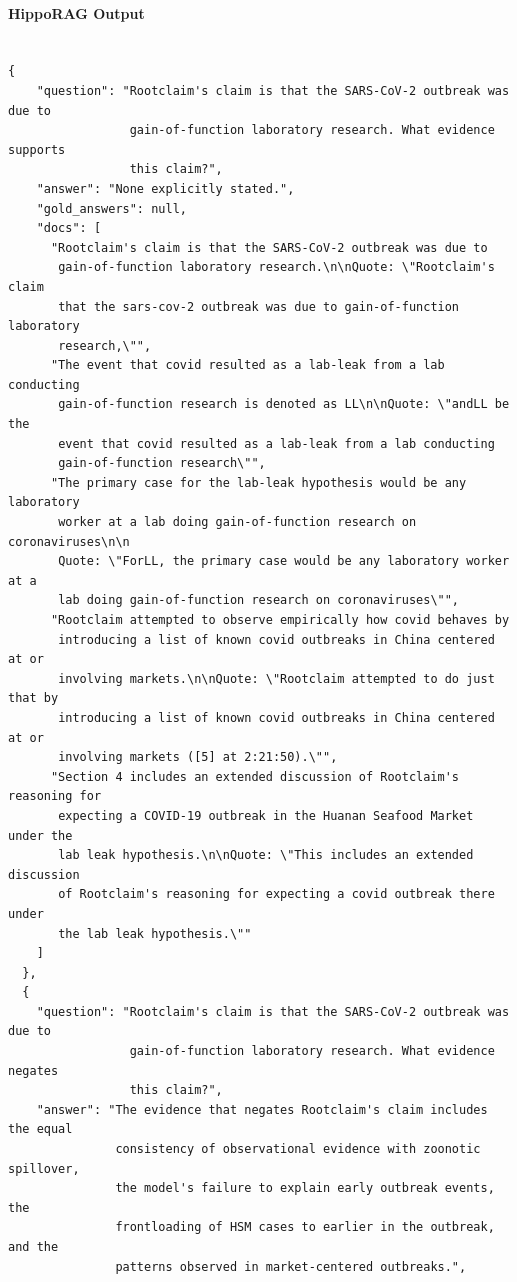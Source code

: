 \documentclass{article}
\begin{document}
\paragraph{HippoRAG Output}
\begin{verbatim}

{
    "question": "Rootclaim's claim is that the SARS-CoV-2 outbreak was due to 
                 gain-of-function laboratory research. What evidence supports 
                 this claim?",
    "answer": "None explicitly stated.",
    "gold_answers": null,
    "docs": [
      "Rootclaim's claim is that the SARS-CoV-2 outbreak was due to 
       gain-of-function laboratory research.\n\nQuote: \"Rootclaim's claim 
       that the sars-cov-2 outbreak was due to gain-of-function laboratory 
       research,\"",
      "The event that covid resulted as a lab-leak from a lab conducting 
       gain-of-function research is denoted as LL\n\nQuote: \"andLL be the 
       event that covid resulted as a lab-leak from a lab conducting 
       gain-of-function research\"",
      "The primary case for the lab-leak hypothesis would be any laboratory 
       worker at a lab doing gain-of-function research on coronaviruses\n\n
       Quote: \"ForLL, the primary case would be any laboratory worker at a 
       lab doing gain-of-function research on coronaviruses\"",
      "Rootclaim attempted to observe empirically how covid behaves by 
       introducing a list of known covid outbreaks in China centered at or 
       involving markets.\n\nQuote: \"Rootclaim attempted to do just that by 
       introducing a list of known covid outbreaks in China centered at or 
       involving markets ([5] at 2:21:50).\"",
      "Section 4 includes an extended discussion of Rootclaim's reasoning for 
       expecting a COVID-19 outbreak in the Huanan Seafood Market under the 
       lab leak hypothesis.\n\nQuote: \"This includes an extended discussion 
       of Rootclaim's reasoning for expecting a covid outbreak there under 
       the lab leak hypothesis.\""
    ]
  },
  {
    "question": "Rootclaim's claim is that the SARS-CoV-2 outbreak was due to 
                 gain-of-function laboratory research. What evidence negates 
                 this claim?",
    "answer": "The evidence that negates Rootclaim's claim includes the equal 
               consistency of observational evidence with zoonotic spillover, 
               the model's failure to explain early outbreak events, the 
               frontloading of HSM cases to earlier in the outbreak, and the 
               patterns observed in market-centered outbreaks.",

\end{verbatim}
\end{document}
